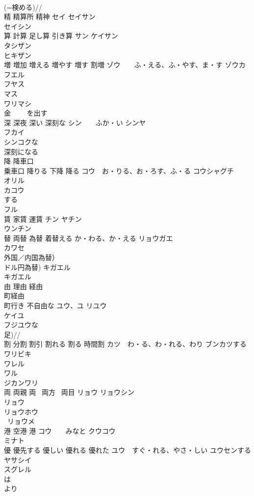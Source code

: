 \documentclass[8pt]{extreport}
\begin{document}
\begin{CJK}{UTF8}{min}
\\	(=検める)//
\\	精 精算所 精神	セイ セイサン 
\\	セイシン 
\\	算 計算 足し算 引き算	サン ケイサン 
\\	タシザン 
\\	ヒキザン 
\\	増 増加 増える 増やす 増す 割増	ゾウ　　ふ・える、ふ・やす、ま・す ゾウカ 
\\	フエル 
\\	フヤス 
\\	マス 
\\	ワリマシ 
\\	金 　　を出す 
\\	深 深夜 深い 深刻な	シン　　ふか・い シンヤ　
\\	フカイ 
\\	シンコクな 
\\	深刻になる 
\\	降 降車口 
\\	乗車口 降りる 下降 降る	コウ　お・りる、お・ろす、ふ・る コウシャグチ 
\\	オリル 
\\	カコウ 
\\	する 
\\	フル 
\\	賃 家賃 運賃	チン ヤチン 
\\	ウンチン 
\\	替 両替 為替 着替える	か・わる、か・える リョウガエ 
\\	カワセ 
\\	外国／内国為替） 
\\	ドル円為替) キガエル 
\\	キガエル
\\	由 理由 経由 　
\\	町経由
\\	町行き 不自由な	ユウ、ユ リユウ 
\\	ケイユ 
\\	フジユウな 
\\	足)//
\\	割 分割 割引 割れる 割る 時間割	カツ　わ・る、わ・れる、わり ブンカツする 
\\	ワリビキ 
\\	ワレル 
\\	ワル 
\\	ジカンワリ 
\\	両 両親 両~ 両方 ~両目	リョウ リョウシン 
\\	リョウ~ 
\\	リョウホウ 
\\	~リョウメ 
\\	港 空港 港	コウ　　みなと クウコウ 
\\	ミナト 
\\	優 優先する 優しい 優れる 優れた	ユウ　すぐ・れる、やさ・しい ユウセンする 
\\	ヤサシイ 
\\	スグレル 
\\	は
\\	より~


\end{CJK}
\end{document}
